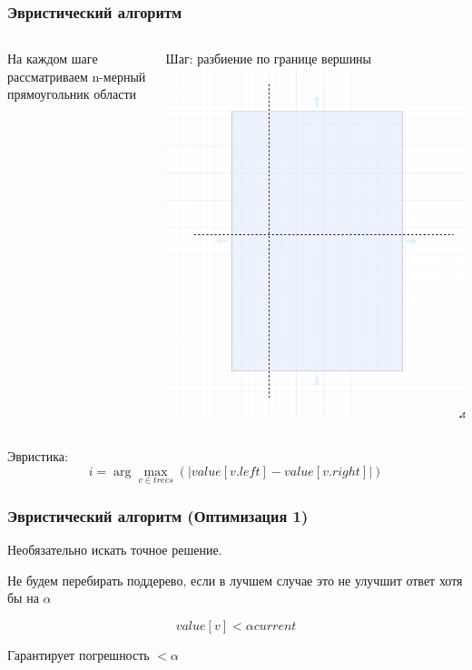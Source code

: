 \documentclass{beamer}
\begin{document}
\begin{frame} \frametitle{Эвристический алгоритм}

    \begin{columns}
            На каждом шаге рассматриваем n-мерный прямоугольник области

            Шаг: разбиение по границе вершины
            \includegraphics[width=\textwidth]{split.png}
    \end{columns}
    \vfill
    \pause{}
    Эвристика:
    \[
        i = \arg \max_{v \in trees}(|value[v.left] - value[v.right]|)
    \]
\end{frame}

\begin{frame} \frametitle{Эвристический алгоритм (Оптимизация 1)}
    Необязательно искать точное решение.

    \vspace{50px}
    Не будем перебирать поддерево, если в лучшем случае это не улучшит ответ хотя бы на $\alpha$

    \[
        value[v] < \alpha current
    \]

    Гарантирует погрешность $<\alpha$
\end{frame}
\end{document}
